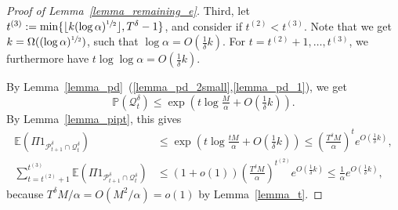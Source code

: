 \documentclass{article}
\theoremstyle{plain}
\theoremstyle{remark}
\theoremstyle{plain}
\numberwithin{equation}{section}
\begin{document}
\begin{proof}[Proof of Lemma~\ref{lemma_remaining_e}]
		Third, let $t^{(3)}:=\min\{\lfloor k(\log\alpha)^{\sfrac12}\rfloor,T^{\delta}-1\}$, and consider if $t^{(2)}<t^{(3)}$. Note that we get $k=\Omega((\log\alpha)^{\sfrac12})$, such that $\log\alpha=O(\tfrac1{\delta}k)$. For $t=t^{(2)}+1,\ldots,t^{(3)}$, we furthermore have $t\log\log\alpha=O(\tfrac1{\delta}k)$.
		
		By Lemma~\ref{lemma_pd}~(\ref{lemma_pd_2small},\ref{lemma_pd_1}), we get $$\mathbb{P}(\mathcal{Q}_t^{\delta})\leq\exp\left(t\log\tfrac{M}{\alpha}+O(\tfrac1{\delta}k)\right).$$ By Lemma~\ref{lemma_pipt}, this gives
		\begin{align}
			\mathbb{E}(\Pi1_{\mathcal{P}_{t+1}^{\delta}\cap\mathcal{Q}_t^{\delta}})
			&\leq\exp\left(t\log\tfrac{tM}{\alpha}+O(\tfrac1{\delta}k)\right)\leq(\tfrac{T^{\delta}M}{\alpha})^te^{O(\frac1{\delta}k)},
			\\\sum_{t=t^{(2)}+1}^{t^{(3)}}\mathbb{E}(\Pi1_{\mathcal{P}_{t+1}^{\delta}\cap\mathcal{Q}_t^{\delta}})
			&\leq(1+o(1))(\tfrac{T^{\delta}M}{\alpha})^{t^{(2)}}e^{O(\frac1{\delta}k)}\leq\tfrac{1}{\alpha}e^{O(\frac1{\delta}k)},
		\end{align}
		because $T^{\delta}M/\alpha=O(M^2/\alpha)=o(1)$ by Lemma~\ref{lemma_t}.
		

\end{proof}
\end{document}

